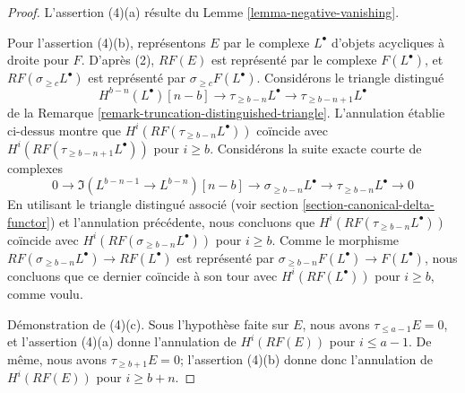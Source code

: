 \begin{proof}
\medskip\noindent
L'assertion (4)(a) résulte du Lemme \ref{lemma-negative-vanishing}.

\medskip\noindent
Pour l'assertion (4)(b), représentons $E$ par le complexe $L^\bullet$
d'objets acycliques à droite pour $F$. D'après (2), $RF(E)$ est représenté
par le complexe $F(L^\bullet)$, et $RF(\sigma_{\geq c}L^\bullet)$ est
représenté par $\sigma_{\geq c}F(L^\bullet)$. Considérons le triangle
distingué
$$
H^{b - n}(L^\bullet)[n - b] \to
\tau_{\geq b - n}L^\bullet \to
\tau_{\geq b - n + 1}L^\bullet
$$
de la Remarque \ref{remark-truncation-distinguished-triangle}.
L'annulation établie ci-dessus montre que
$H^i(RF(\tau_{\geq b - n}L^\bullet))$ coïncide avec
$H^i(RF(\tau_{\geq b - n + 1}L^\bullet))$ pour $i \geq b$.
Considérons la suite exacte courte de complexes
$$
0 \to
\Im(L^{b - n - 1} \to L^{b - n})[n - b] \to
\sigma_{\geq b - n}L^\bullet \to
\tau_{\geq b - n}L^\bullet \to 0
$$
En utilisant le triangle distingué associé (voir
section \ref{section-canonical-delta-functor}) et l'annulation précédente,
nous concluons que $H^i(RF(\tau_{\geq b - n}L^\bullet))$ coïncide avec
$H^i(RF(\sigma_{\geq b - n}L^\bullet))$ pour $i \geq b$.
Comme le morphisme
$RF(\sigma_{\geq b - n}L^\bullet) \to RF(L^\bullet)$ est représenté par
$\sigma_{\geq b - n}F(L^\bullet) \to F(L^\bullet)$, nous concluons que ce
dernier coïncide à son tour avec $H^i(RF(L^\bullet))$ pour $i \geq b$, comme
voulu.

\medskip\noindent
Démonstration de (4)(c). Sous l'hypothèse faite sur $E$, nous avons
$\tau_{\leq a - 1}E = 0$, et l'assertion (4)(a) donne l'annulation de
$H^i(RF(E))$ pour $i \leq a - 1$. De même, nous avons
$\tau_{\geq b + 1}E = 0$; l'assertion (4)(b) donne donc l'annulation de
$H^i(RF(E))$ pour $i \geq b + n$.
\end{proof}

